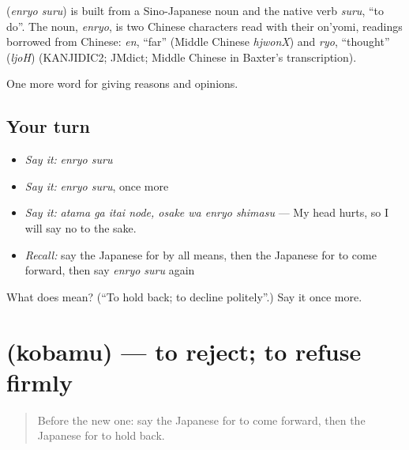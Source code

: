 \begin{cousinweb}
\textbf{} (\emph{enryo suru}) is built from a Sino-Japanese noun and the native verb \emph{suru}, \textquotedblleft{}to do\textquotedblright{}. The noun, \emph{enryo}, is two Chinese characters read with their on'yomi, readings borrowed from Chinese: \emph{en}, \textquotedblleft{}far\textquotedblright{} (Middle Chinese \emph{hjwonX}) and \emph{ryo}, \textquotedblleft{}thought\textquotedblright{} (\emph{ljoH}) (KANJIDIC2; JMdict; Middle Chinese in Baxter's transcription).
\end{cousinweb}

\begin{grammarlens}[title={What you've built}]
One more word for giving reasons and opinions.
\end{grammarlens}

\subsection*{Your turn}
\begin{itemize}
\raggedright
  \item \emph{Say it:} \emph{enryo suru}
  \item \emph{Say it:} \emph{enryo suru}, once more
  \item \emph{Say it:} \emph{atama ga itai node, osake wa enryo shimasu} — My head hurts, so I will say no to the sake.
  \item \emph{Recall:} say the Japanese for by all means, then the Japanese for to come forward, then say \emph{enryo suru} again
\end{itemize}

\begin{tcolorbox}[breakable,colback=teal!4,colframe=teal!35!black,title={Before you move on}]
What does  mean? (\textquotedblleft{}To hold back; to decline politely\textquotedblright{}.) Say it once more.
\end{tcolorbox}
\section[\texorpdfstring{\ja{こばむ} (kobamu)}{こばむ (kobamu)}]{ (kobamu) — to reject; to refuse firmly}

\label{lesson:JA-C323-kobamu}



\begin{quote}
Before the new one: say the Japanese for to come forward, then the Japanese for to hold back.
\end{quote}

